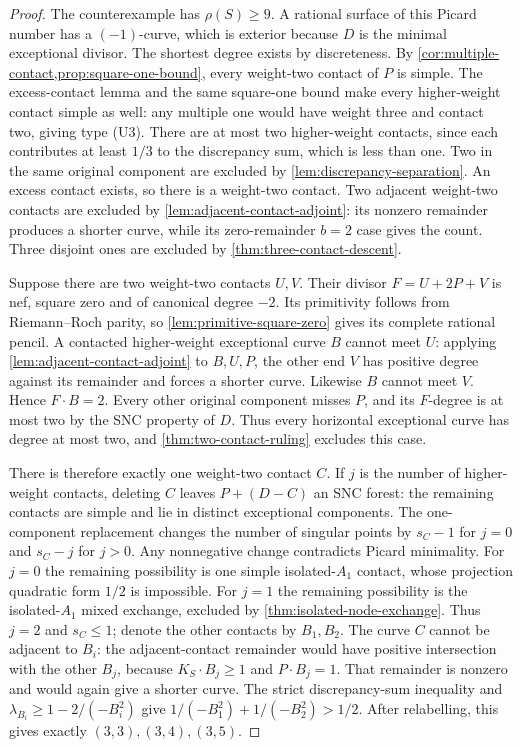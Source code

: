 \documentclass[11pt,reqno]{amsart}
\theoremstyle{definition}
\theoremstyle{remark}
\numberwithin{equation}{section}
\begin{document}
\begin{proof}
The counterexample has $\rho(S)\ge9$.
A rational surface of this Picard number has a $(-1)$-curve, which is
exterior because $D$ is the minimal exceptional divisor.
The shortest degree exists by discreteness.
By \cref{cor:multiple-contact,prop:square-one-bound}, every weight-two contact of $P$ is simple.
The excess-contact lemma and the same square-one bound make every
higher-weight contact simple as well: any multiple one would have
weight three and contact two, giving type \textup{(U3)}.
There are at most two higher-weight contacts, since each contributes
at least $1/3$ to the discrepancy sum, which is less than one. Two in the same
original component are excluded by \cref{lem:discrepancy-separation}.
An excess contact exists, so there is a weight-two contact.
Two adjacent weight-two contacts are excluded by
\cref{lem:adjacent-contact-adjoint}: its nonzero remainder produces
a shorter curve, while its zero-remainder $b=2$ case gives the count.
Three disjoint ones are excluded by
\cref{thm:three-contact-descent}.

Suppose there are two weight-two contacts $U,V$.
Their divisor $F=U+2P+V$ is nef, square zero and of canonical
degree $-2$. Its primitivity follows from Riemann--Roch parity,
so \cref{lem:primitive-square-zero} gives its complete rational pencil.
A contacted higher-weight exceptional curve $B$ cannot meet $U$: applying
\cref{lem:adjacent-contact-adjoint} to $B,U,P$, the other end $V$
has positive degree against its remainder and forces a shorter curve.
Likewise $B$ cannot meet $V$. Hence $F\cdot B=2$.
Every other original component misses $P$, and its $F$-degree is at most
two by the SNC property of $D$. Thus every horizontal exceptional curve has degree at most two, and
\cref{thm:two-contact-ruling} excludes this case.

There is therefore exactly one weight-two contact $C$.
If $j$ is the number of higher-weight contacts, deleting $C$ leaves
$P+(D-C)$ an SNC forest: the remaining contacts are simple and lie
in distinct exceptional components. The one-component replacement changes the number of singular points by $s_C-1$ for $j=0$ and $s_C-j$ for $j>0$.
Any nonnegative change contradicts Picard minimality.
For $j=0$ the remaining possibility is one simple isolated-$A_1$
contact, whose projection quadratic form $1/2$ is impossible.
For $j=1$ the remaining possibility is the isolated-$A_1$ mixed
exchange, excluded by \cref{thm:isolated-node-exchange}.
Thus $j=2$ and $s_C\le1$; denote the other contacts by $B_1,B_2$.
The curve $C$ cannot be adjacent to $B_i$: the adjacent-contact
remainder would have positive intersection with the other $B_j$,
because $K_S\cdot B_j\ge1$ and $P\cdot B_j=1$.
That remainder is nonzero and would again give a shorter curve.
The strict discrepancy-sum inequality and $\lambda_{B_i}\ge1-2/(-B_i^2)$ give
$1/(-B_1^2)+1/(-B_2^2)>1/2$.
After relabelling, this gives exactly $(3,3),(3,4),(3,5)$.


\end{proof}
\end{document}
